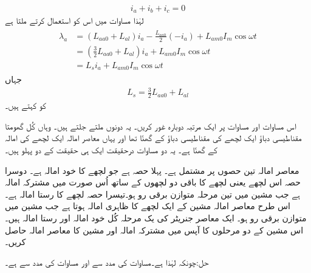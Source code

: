 \begin{align}
i_a+i_b+i_c=0
\end{align}
لہٰذا مساوات   میں اس کو استعمال کرتے ملتا ہے
\begin{gather}
\begin{aligned}
\lambda_a&=\left(L_{aa0}+L_{al} \right)i_a-\frac{L_{aa0}}{2} \left( -i_a \right)+L_{am0} I_m \cos \omega t\\
&=\left(\frac{3}{2} L_{aa0}+L_{al} \right)i_a+L_{am0} I_m \cos \omega t\\
&=L_s i_a+L_{am0} I_m \cos \omega t
\end{aligned}
\end{gather}
جہاں
\begin{align}\label{مساوات_معاصر_معاصر_امالہ}
L_s=\frac{3}{2} L_{aa0}+L_{al}
\end{align}
کو  کہتے ہیں۔

اس مساوات اور مساوات   پر ایک مرتبہ دوبارہ غور کریں۔ یہ دونوں ملتے جلتے ہیں۔ وہاں کُل گھومتا مقناطیسی دباؤ ایک لچھے کی مقناطیسی دباؤ کے   گھنّا تھا اور یہاں معاصر امالہ ایک لچھے کی امالہ کے  گھنّا ہے۔ یہ دو مساوات درحقیقت ایک ہی حقیقت کے دو پہلو ہیں۔

معاصر امالہ تین حصوں پر مشتمل ہے۔ پہلا حصہ  ہے جو  لچھے کا خود امالہ ہے۔ دوسرا حصہ   اس لچھے یعنی  لچھے کا باقی دو لچھوں کے ساتھ اُس صورت میں مشترکہ امالہ ہے جب مشین میں تین مرحلہ متوازن برقی رو ہو۔تیسرا حصہ  لچھے   کا رستا امالہ ہے۔ اس طرح معاصر امالہ مشین کے ایک لچھے کا ظاہری امالہ ہوتا ہے جب مشین میں متوازن برقی رو ہو۔
%
ایک معاصر جنریٹر کی یک مرحلہ  کُل خود امالہ  اور رستا امالہ  ہیں۔اس مشین کے دو مرحلوں  کا آپس میں مشترکہ امالہ اور مشین کا معاصر امالہ حاصل کریں۔

حل:چونکہ   لہٰذا  ہے۔مساوات   کی مدد سے   اور مساوات   کی مدد سے   ہے۔
%

